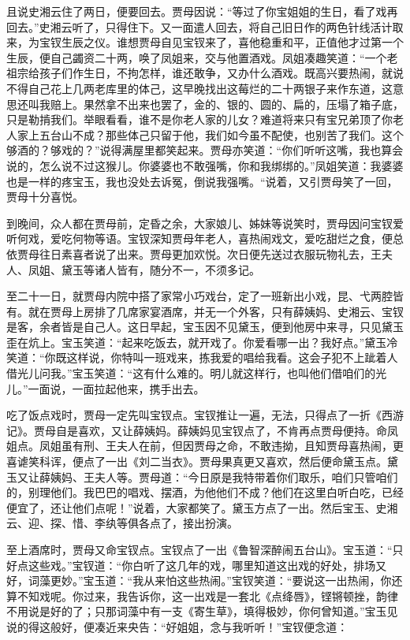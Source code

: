 \documentclass[12pt,oneside]{book}
\begin{document}
且说史湘云住了两日，便要回去。贾母因说：“等过了你宝姐姐的生日，看了戏再回去。”史湘云听了，只得住下。又一面遣人回去，将自己旧日作的两色针线活计取来，为宝钗生辰之仪。谁想贾母自见宝钗来了，喜他稳重和平，正值他才过第一个生辰，便自己蠲资二十两，唤了凤姐来，交与他置酒戏。凤姐凑趣笑道：“一个老祖宗给孩子们作生日，不拘怎样，谁还敢争，又办什么酒戏。既高兴要热闹，就说不得自己花上几两老库里的体己，这早晚找出这莓烂的二十两银子来作东道，这意思还叫我赔上。果然拿不出来也罢了，金的、银的、圆的、扁的，压塌了箱子底，只是勒掯我们。举眼看看，谁不是你老人家的儿女？难道将来只有宝兄弟顶了你老人家上五台山不成？那些体己只留于他，我们如今虽不配使，也别苦了我们。这个够酒的？够戏的？”说得满屋里都笑起来。贾母亦笑道：“你们听听这嘴，我也算会说的，怎么说不过这猴儿。你婆婆也不敢强嘴，你和我绑绑的。”凤姐笑道：我婆婆也是一样的疼宝玉，我也没处去诉冤，倒说我强嘴。“说着，又引贾母笑了一回，贾母十分喜悦。

到晚间，众人都在贾母前，定昏之余，大家娘儿、姊妹等说笑时，贾母因问宝钗爱听何戏，爱吃何物等语。宝钗深知贾母年老人，喜热闹戏文，爱吃甜烂之食，便总依贾母往日素喜者说了出来。贾母更加欢悦。次日便先送过衣服玩物礼去，王夫人、凤姐、黛玉等诸人皆有，随分不一，不须多记。

至二十一日，就贾母内院中搭了家常小巧戏台，定了一班新出小戏，昆、弋两腔皆有。就在贾母上房排了几席家宴酒席，并无一个外客，只有薛姨妈、史湘云、宝钗是客，余者皆是自己人。这日早起，宝玉因不见黛玉，便到他房中来寻，只见黛玉歪在炕上。宝玉笑道：“起来吃饭去，就开戏了。你爱看哪一出？我好点。”黛玉冷笑道：“你既这样说，你特叫一班戏来，拣我爱的唱给我看。这会子犯不上跐着人借光儿问我。”宝玉笑道：“这有什么难的。明儿就这样行，也叫他们借咱们的光儿。”一面说，一面拉起他来，携手出去。

吃了饭点戏时，贾母一定先叫宝钗点。宝钗推让一遍，无法，只得点了一折《西游记》。贾母自是喜欢，又让薛姨妈。薛姨妈见宝钗点了，不肯再点贾母便持。命凤姐点。凤姐虽有刑、王夫人在前，但因贾母之命，不敢违拗，且知贾母喜热闹，更喜谑笑科诨，便点了一出《刘二当衣》。贾母果真更又喜欢，然后便命黛玉点。黛玉又让薛姨妈、王夫人等。贾母道：“今日原是我特带着你们取乐，咱们只管咱们的，别理他们。我巴巴的唱戏、摆酒，为他他们不成？他们在这里白听白吃，已经便宜了，还让他们点呢！”说着，大家都笑了。黛玉方点了一出。然后宝玉、史湘云、迎、探、惜、李纨等俱各点了，接出扮演。

至上酒席时，贾母又命宝钗点。宝钗点了一出《鲁智深醉闹五台山》。宝玉道：“只好点这些戏。”宝钗道：“你白听了这几年的戏，哪里知道这出戏的好处，排场又好，词藻更妙。”宝玉道：“我从来怕这些热闹。”宝钗笑道：“要说这一出热闹，你还算不知戏呢。你过来，我告诉你，这一出戏是一套北《点绛唇》，铿锵顿挫，韵律不用说是好的了；只那词藻中有一支《寄生草》，填得极妙，你何曾知道。”宝玉见说的得这般好，便凑近来央告：“好姐姐，念与我听听！”宝钗便念道：
\end{document}
